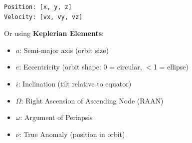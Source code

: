 \documentclass[11pt,a4paper]{article}
\begin{document}
\begin{lstlisting}
Position: [x, y, z]
Velocity: [vx, vy, vz]
\end{lstlisting}

Or using \textbf{Keplerian Elements}:
\begin{itemize}[leftmargin=*]
    \item \textbf{$a$}: Semi-major axis (orbit size)
    \item \textbf{$e$}: Eccentricity (orbit shape: 0 = circular, $<$1 = ellipse)
    \item \textbf{$i$}: Inclination (tilt relative to equator)
    \item \textbf{$\Omega$}: Right Ascension of Ascending Node (RAAN)
    \item \textbf{$\omega$}: Argument of Periapsis
    \item \textbf{$\nu$}: True Anomaly (position in orbit)
\end{itemize}
\end{document}
